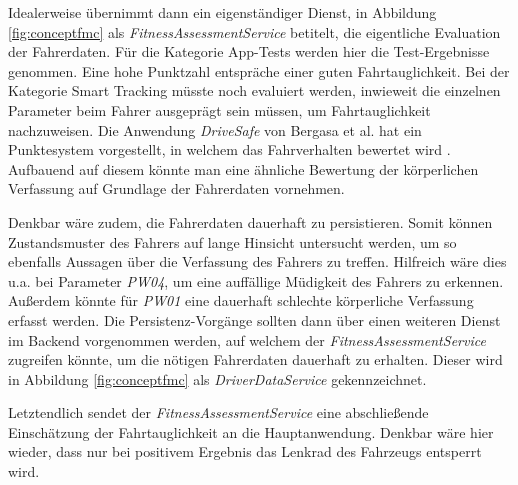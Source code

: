 Idealerweise übernimmt dann ein eigenständiger Dienst, in Abbildung \ref{fig:conceptfmc} als \textit{FitnessAssessmentService} betitelt, die eigentliche Evaluation der Fahrerdaten. Für die Kategorie App-Tests werden hier die Test-Ergebnisse genommen. Eine hohe Punktzahl entspräche einer guten Fahrtauglichkeit. Bei der Kategorie Smart Tracking müsste noch evaluiert werden, inwieweit die einzelnen Parameter beim Fahrer ausgeprägt sein müssen, um Fahrtauglichkeit nachzuweisen. Die Anwendung \textit{DriveSafe} von Bergasa et al. hat ein Punktesystem vorgestellt, in welchem das Fahrverhalten bewertet wird \cite{drivesafe}. Aufbauend auf diesem könnte man eine ähnliche Bewertung der körperlichen Verfassung auf Grundlage der Fahrerdaten vornehmen. 

Denkbar wäre zudem, die Fahrerdaten dauerhaft zu persistieren. Somit können Zustandsmuster des Fahrers auf lange Hinsicht untersucht werden, um so ebenfalls Aussagen über die Verfassung des Fahrers zu treffen. Hilfreich wäre dies u.a. bei Parameter \textit{PW04}, um eine auffällige Müdigkeit des Fahrers zu erkennen. Außerdem könnte für \textit{PW01} eine dauerhaft schlechte körperliche Verfassung erfasst werden. Die Persistenz-Vorgänge sollten dann über einen weiteren Dienst im Backend vorgenommen werden, auf welchem der \textit{FitnessAssessmentService} zugreifen könnte, um die nötigen Fahrerdaten dauerhaft zu erhalten. Dieser wird in Abbildung \ref{fig:conceptfmc} als \textit{DriverDataService} gekennzeichnet.

Letztendlich sendet der \textit{FitnessAssessmentService} eine abschließende Einschätzung der Fahrtauglichkeit an die Hauptanwendung. Denkbar wäre hier wieder, dass nur bei positivem Ergebnis das Lenkrad des Fahrzeugs entsperrt wird. 
